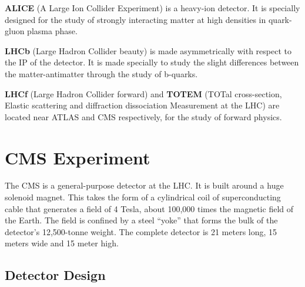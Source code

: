 {\bf ALICE} (A Large Ion Collider Experiment) is a heavy-ion detector. It is specially designed for the study of strongly interacting matter at high densities in quark-gluon plasma phase.

{\bf LHCb} (Large Hadron Collider beauty) is made asymmetrically with respect to the IP of the detector. It is made specially to study the slight differences between the matter-antimatter through the study of b-quarks.

{\bf LHCf} (Large Hadron Collider forward) and {\bf TOTEM} (TOTal cross-section, Elastic scattering and diffraction dissociation Measurement at the LHC) are located near ATLAS and CMS respectively, for the study of forward physics.

\section{CMS Experiment} %
\label{sec:cms_experiment}

The CMS is a general-purpose detector at the LHC. It is built around a huge solenoid magnet. This takes the form of a cylindrical coil of superconducting cable that generates a field of 4 Tesla, about 100,000 times the magnetic field of the Earth. The field is confined by a steel ``yoke'' that forms the bulk of the detector's 12,500-tonne weight. The complete detector is 21 meters long, 15 meters wide and 15 meter high.

\subsection{Detector Design} %
\label{sub:detector_design}

